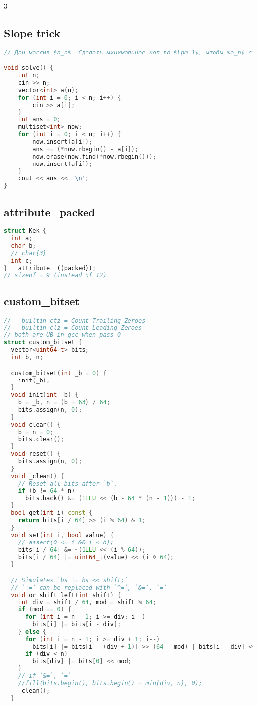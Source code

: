 \documentclass[9pt,a4paper,landscape,twosided]{extarticle}
\begin{document}
\begin{multicols*}{3}
\subsection{Slope trick}
\begin{lstlisting}[language=C++]
// Дан массив $a_n$. Сделать минимальное кол-во $\pm 1$, чтобы $a_n$ стал неубывающим.

void solve() {
    int n;
    cin >> n;
    vector<int> a(n);
    for (int i = 0; i < n; i++) {
        cin >> a[i];
    }
    int ans = 0;
    multiset<int> now;
    for (int i = 0; i < n; i++) {
        now.insert(a[i]);
        ans += (*now.rbegin() - a[i]);
        now.erase(now.find(*now.rbegin()));
        now.insert(a[i]);
    }
    cout << ans << '\n';
}
\end{lstlisting}

\subsection{attribute\_packed}
\begin{lstlisting}[language=C++]
struct Kek {
  int a;
  char b;
  // char[3]
  int c;
} __attribute__((packed));
// sizeof = 9 (instead of 12)
\end{lstlisting}

\subsection{custom\_bitset}
\begin{lstlisting}[language=C++]
// __builtin_ctz = Count Trailing Zeroes
// __builtin_clz = Count Leading Zeroes
// both are UB in gcc when pass 0
struct custom_bitset {
  vector<uint64_t> bits;
  int b, n;

  custom_bitset(int _b = 0) {
    init(_b);
  }
  void init(int _b) {
    b = _b, n = (b + 63) / 64;
    bits.assign(n, 0);
  }
  void clear() {
    b = n = 0;
    bits.clear();
  }
  void reset() {
    bits.assign(n, 0);
  }
  void _clean() {
    // Reset all bits after `b`.
    if (b != 64 * n)
      bits.back() &= (1LLU << (b - 64 * (n - 1))) - 1;
  }
  bool get(int i) const {
    return bits[i / 64] >> (i % 64) & 1;
  }
  void set(int i, bool value) {
    // assert(0 <= i && i < b);
    bits[i / 64] &= ~(1LLU << (i % 64));
    bits[i / 64] |= uint64_t(value) << (i % 64);
  }

  // Simulates `bs |= bs << shift;`
  // `|=` can be replaced with `^=`, `&=`, `=`
  void or_shift_left(int shift) {
    int div = shift / 64, mod = shift % 64;
    if (mod == 0) {
      for (int i = n - 1; i >= div; i--)
        bits[i] |= bits[i - div];
    } else {
      for (int i = n - 1; i >= div + 1; i--)
        bits[i] |= bits[i - (div + 1)] >> (64 - mod) | bits[i - div] << mod;
      if (div < n)
        bits[div] |= bits[0] << mod;
    }
    // if `&=`, `=`
    //fill(bits.begin(), bits.begin() + min(div, n), 0);
    _clean();
  }


\end{lstlisting}
\end{multicols*}
\end{document}
